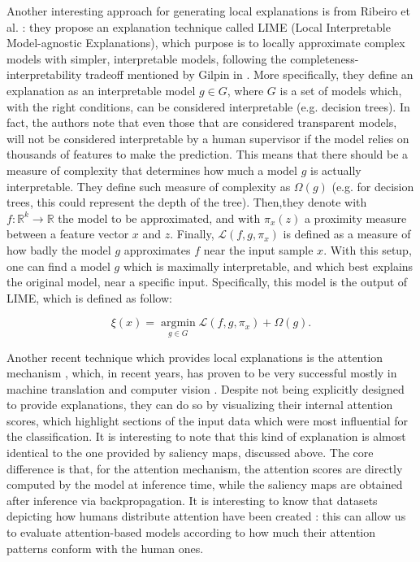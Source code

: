 Another interesting approach for generating local explanations is from Ribeiro et al. \cite{ribeiro2016trust}: they propose an explanation technique called LIME (Local Interpretable Model-agnostic Explanations), which purpose is to locally approximate complex models with simpler, interpretable models, following the completeness-interpretability tradeoff mentioned by Gilpin in \cite{gilpin2018explaining}
. More specifically, they define an explanation as an interpretable model $g \in G$, where $G$ is a set of models which, with the right conditions, can be considered interpretable (e.g. decision trees). In fact, the authors note that even those that are considered transparent models, will not be considered interpretable by a human supervisor if the model relies on thousands of features to make the prediction. This means that there should be a measure of complexity that determines how much a  model $g$ is actually interpretable. They define such measure of complexity as $\Omega(g)$ (e.g. for decision trees, this could represent the depth of the tree). Then,they denote with $f:\mathbb{R}^k\rightarrow \mathbb{R}$ the model to be approximated, and with $\pi _x (z)$ a proximity measure between a feature vector $x$ and $z$. Finally, $\mathcal{L}(f,g,\pi_x)$ is defined as a measure of how badly the model $g$ approximates $f$ near the input sample $x$. With this setup, one can find a model $g$ which is maximally interpretable, and which best explains the original model, near a specific input. Specifically, this model is the output of LIME, which is defined as follow:

$$\xi(x)=\underset{g \in G}{\operatorname{argmin}} \mathcal{L}\left(f, g, \pi_{x}\right)+\Omega(g).$$

Another recent technique which provides local explanations is the attention mechanism \cite{attentionisall2017vaswani}, which, in recent years, has proven to be very successful mostly in machine translation \cite{devlin2018bert} and computer vision \cite{dosovitskiy2020image}.
Despite not being explicitly designed to provide explanations, they can do so by visualizing their internal attention scores, which highlight sections of the input data which were most influential for the classification. It is interesting to note that this kind of explanation is almost identical to the one provided by saliency maps, discussed above. The core difference is that, for the attention mechanism, the attention scores are directly computed by the model at inference time, while the saliency maps are obtained after inference via backpropagation.
It is interesting to know that datasets depicting how humans distribute attention have been created \cite{park2018multimodal,das2017human}: this can allow us to evaluate attention-based models according to how much their attention patterns conform with the human ones.

